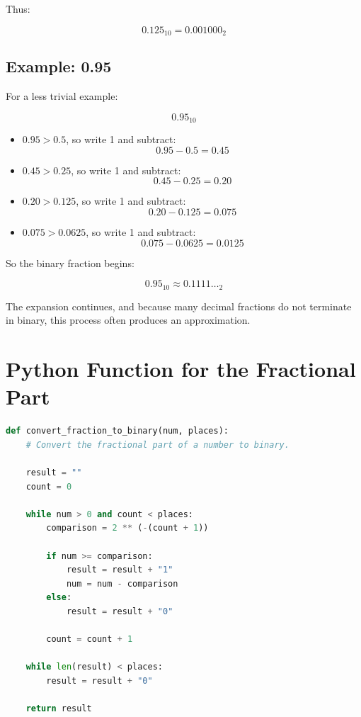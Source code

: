 \documentclass[11pt]{article}
\begin{document}
Thus:

\[
0.125_{10} = 0.001000_2
\]

\subsection{Example: 0.95}

For a less trivial example:

\[
0.95_{10}
\]

\begin{itemize}
    \item $0.95 > 0.5$, so write 1 and subtract:
    \[
    0.95 - 0.5 = 0.45
    \]
    \item $0.45 > 0.25$, so write 1 and subtract:
    \[
    0.45 - 0.25 = 0.20
    \]
    \item $0.20 > 0.125$, so write 1 and subtract:
    \[
    0.20 - 0.125 = 0.075
    \]
    \item $0.075 > 0.0625$, so write 1 and subtract:
    \[
    0.075 - 0.0625 = 0.0125
    \]
\end{itemize}

So the binary fraction begins:

\[
0.95_{10} \approx 0.1111\ldots_2
\]

The expansion continues, and because many decimal fractions do not terminate in binary, this process often produces an approximation.

\section{Python Function for the Fractional Part}

\begin{lstlisting}[language=Python]
def convert_fraction_to_binary(num, places):
    # Convert the fractional part of a number to binary.

    result = ""
    count = 0

    while num > 0 and count < places:
        comparison = 2 ** (-(count + 1))

        if num >= comparison:
            result = result + "1"
            num = num - comparison
        else:
            result = result + "0"

        count = count + 1

    while len(result) < places:
        result = result + "0"

    return result
\end{lstlisting}
\end{document}

